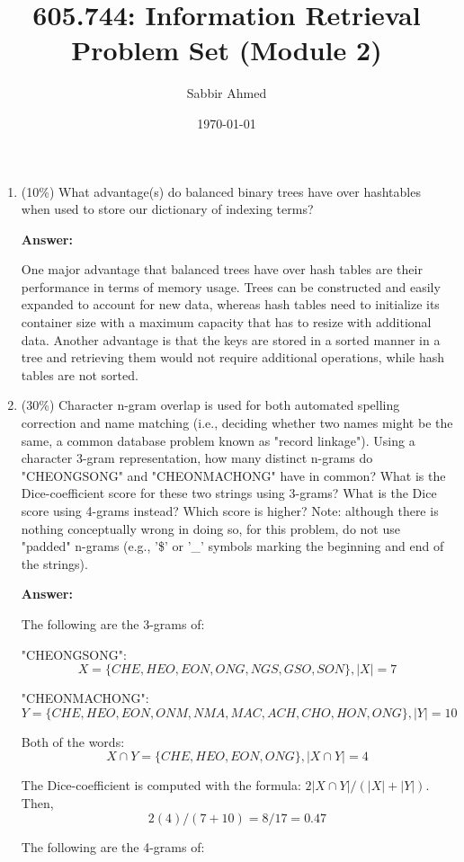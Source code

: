 \documentclass[11pt]{article}
\title{605.744: Information Retrieval \\ Problem Set (Module 2)}
\author{Sabbir Ahmed}
\date{\today}
\begin{document}
\maketitle	

    \begin{enumerate}

        \item (10\%) What advantage(s) do balanced binary trees have over hashtables when used to store our dictionary of indexing terms?

        \textbf{Answer:}

        One major advantage that balanced trees have over hash tables are their performance in terms of memory usage. Trees can be constructed and easily expanded to account for new data, whereas hash tables need to initialize its container size with a maximum capacity that has to resize with additional data. Another advantage is that the keys are stored in a sorted manner in a tree and retrieving them would not require additional operations, while hash tables are not sorted. 

        \item (30\%) Character n-gram overlap is used for both automated spelling correction and name matching (i.e., deciding whether two names might be the same, a common database problem known as "record linkage"). Using a character 3-gram representation, how many distinct n-grams do "CHEONGSONG" and "CHEONMACHONG" have in common? What is the Dice-coefficient score for these two strings using 3-grams? What is the Dice score using 4-grams instead? Which score is higher? Note: although there is nothing conceptually wrong in doing so, for this problem, do not use "padded" n-grams (e.g., '\$' or '\_' symbols marking the beginning and end of the strings).

        \textbf{Answer:}
        
        The following are the 3-grams of:
        
        "CHEONGSONG": \[ X = \{CHE, HEO, EON, ONG, NGS, GSO, SON\}, |X| = 7 \]

        "CHEONMACHONG": \[ Y = \{CHE, HEO, EON, ONM, NMA, MAC, ACH, CHO, HON, ONG\}, |Y| = 10 \]

        Both of the words: \[ X \cap Y = \{CHE, HEO, EON, ONG\}, |X \cap Y| = 4 \]

        The Dice-coefficient is computed with the formula: $2|X \cap Y| / (|X|+|Y|)$. Then, \[ 2(4) / (7 + 10) = 8 / 17 = 0.47 \]

        The following are the 4-grams of:
        

\end{enumerate}
\end{document}
